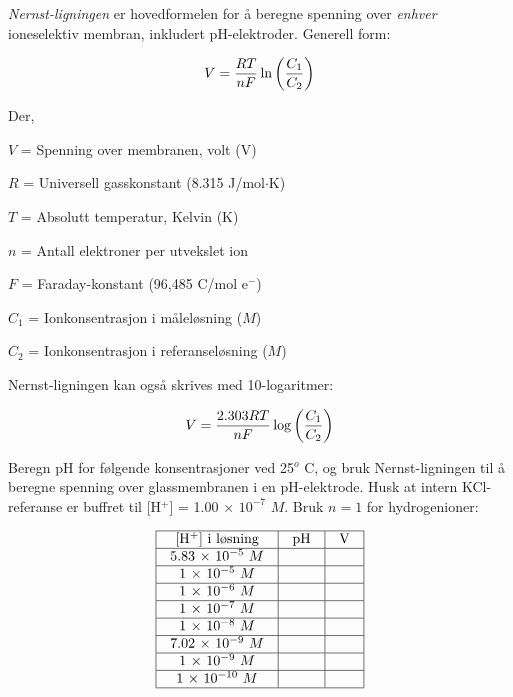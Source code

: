 

{\it Nernst-ligningen} er hovedformelen for å beregne spenning over {\it enhver} ioneselektiv membran, inkludert pH-elektroder. Generell form:

$$V = {{R T} \over {nF}} \ln \left({C_1 \over C_2}\right)$$

\noindent
Der,

$V$ = Spenning over membranen, volt (V)

$R$ = Universell gasskonstant (8.315 J/mol$\cdot$K)

$T$ = Absolutt temperatur, Kelvin (K)

$n$ = Antall elektroner per utvekslet ion

$F$ = Faraday-konstant (96,485 C/mol e$^{-}$)

$C_1$ = Ionkonsentrasjon i måleløsning ($M$)

$C_2$ = Ionkonsentrasjon i referanseløsning ($M$)

\vskip 10pt

Nernst-ligningen kan også skrives med 10-logaritmer:

$$V = {{2.303 R T} \over {nF}} \log \left({C_1 \over C_2}\right)$$

Beregn pH for følgende konsentrasjoner ved 25$^{o}$ C, og bruk Nernst-ligningen til å beregne spenning over glassmembranen i en pH-elektrode. Husk at intern KCl-referanse er buffret til [H$^{+}$] = 1.00 $\times$ $10^{-7}$ $M$. Bruk $n=1$ for hydrogenioner:


$$\vbox{\offinterlineskip
\halign{\strut
\vrule \quad\hfil # \ \hfil & 
\vrule \quad\hfil # \ \hfil & 
\vrule \quad\hfil # \ \hfil \vrule \cr
\noalign{\hrule}
%
[H$^{+}$] i løsning & pH & V \cr
%
\noalign{\hrule}
%
5.83 $\times$ $10^{-5}$ $M$ &  &  \cr
%
\noalign{\hrule}
%
1 $\times$ $10^{-5}$ $M$ &  &  \cr
%
\noalign{\hrule}
%
1 $\times$ $10^{-6}$ $M$ &  &  \cr
%
\noalign{\hrule}
%
1 $\times$ $10^{-7}$ $M$ &  &  \cr
%
\noalign{\hrule}
%
1 $\times$ $10^{-8}$ $M$ &  &  \cr
%
\noalign{\hrule}
%
7.02 $\times$ $10^{-9}$ $M$ &  &  \cr
%
\noalign{\hrule}
%
1 $\times$ $10^{-9}$ $M$ &  &  \cr
%
\noalign{\hrule}
%
1 $\times$ $10^{-10}$ $M$ &  &  \cr
%
\noalign{\hrule}
} %
}$$ %

